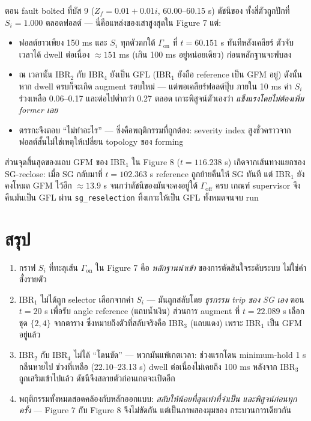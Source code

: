 \documentclass[11pt,a4paper]{article}
\newcommand{\code}[1]{\texttt{\small #1}}
\begin{document}
ตอน fault bolted ที่บัส 9 ($Z_f = 0.01 + 0.01i$, 60.00--60.15 s) ดัชนีของ
ทั้งสี่ตัวถูกปักที่ $S_i = 1.000$ ตลอดฟอลต์ --- นี่คือแหล่งของเสาสูงสุดใน
Figure 7 แต่:

\begin{itemize}
\item ฟอลต์ยาวเพียง 150 ms และ $S_i$ ทุกตัวตกใต้ $\Gamma_{\mathrm{on}}$
      ที่ $t = 60.151$ s ทันทีหลังเคลียร์ ตัวจับเวลาได้ dwell ต่อเนื่อง
      $\approx 151$ ms (เกิน 100 ms อยู่หน่อยเดียว) ก่อนหลักฐานจะพับลง
\item ณ เวลานั้น IBR$_2$ กับ IBR$_4$ ยังเป็น GFL (IBR$_1$ ยังถือ
      reference เป็น GFM อยู่) ดังนั้นหาก dwell ครบก็จะเกิด augment
      รอบใหม่ --- แต่พอเคลียร์ฟอลต์ปุ๊บ ภายใน 10 ms ค่า $S_i$
      ร่วงเหลือ 0.06--0.17 และต่อไปต่ำกว่า 0.27 ตลอด เกาะพิสูจน์ตัวเองว่า
      \emph{แข็งแรงโดยไม่ต้องเพิ่ม former เลย}
\item ตรรกะจึงตอบ ``ไม่ทำอะไร'' --- ซึ่งคือพฤติกรรมที่ถูกต้อง:
      severity index สูงชั่วคราวจากฟอลต์สั้นไม่ใช่เหตุให้เปลี่ยน
      topology ของ forming
\end{itemize}

ส่วนจุดสิ้นสุดของแถบ GFM ของ IBR$_1$ ใน Figure 8 ($t = 116.238$ s)
เกิดจากเส้นทางแยกของ SG-reclose: เมื่อ SG กลับมาที่ $t = 102.363$ s
reference ถูกย้ายคืนให้ SG ทันที แต่ IBR$_1$ ยังคงโหมด GFM ไว้อีก
$\approx 13.9$ s จนกว่าดัชนีของมันจะคงอยู่ใต้ $\Gamma_{\mathrm{off}}$ ครบ
เกณฑ์ supervisor จึงคืนมันเป็น GFL ผ่าน \code{sg\_reselection}
ทิ้งเกาะให้เป็น GFL ทั้งหมดจนจบ run

\section{สรุป}

\begin{enumerate}[label=\textbf{\arabic*.}]
\item กราฟ $S_i$ ที่ทะลุเส้น $\Gamma_{\mathrm{on}}$ ใน Figure 7 คือ
      \emph{หลักฐานนำเข้า} ของการตัดสินใจระดับระบบ ไม่ใช่คำสั่งรายตัว
\item IBR$_1$ ไม่ได้ถูก selector เลือกจากค่า $S_i$ --- มันถูกสลับโดย
      \emph{ธุรกรรม trip ของ SG เอง} ตอน $t = 20$ s เพื่อรับ angle
      reference (แถบน้ำเงิน) ส่วนการ augment ที่ $t = 22.089$ s เลือกชุด
      $\{2,4\}$ จากตาราง ซึ่งหมายถึงตัวที่สลับจริงคือ IBR$_3$
      (แถบแดง) เพราะ IBR$_1$ เป็น GFM อยู่แล้ว
\item IBR$_2$ กับ IBR$_4$ ไม่ได้ ``โดนขัด'' --- พวกมันแพ้เกตเวลา:
      ช่วงแรกโดน minimum-hold 1 s กลืนหายไป ช่วงที่เหลือ (22.10--23.13 s)
      dwell ต่อเนื่องไม่เคยถึง 100 ms หลังจาก IBR$_3$ ถูกเสริมเข้าไปแล้ว
      ดัชนีจึงสลายตัวก่อนเกตจะเปิดอีก
\item พฤติกรรมทั้งหมดสอดคล้องกับหลักออกแบบ:
      \emph{สลับให้น้อยที่สุดเท่าที่จำเป็น และพิสูจน์ก่อนทุกครั้ง}
      --- Figure 7 กับ Figure 8 จึงไม่ขัดกัน แต่เป็นภาพสองมุมของ
      กระบวนการเดียวกัน
\end{enumerate}
\end{document}
